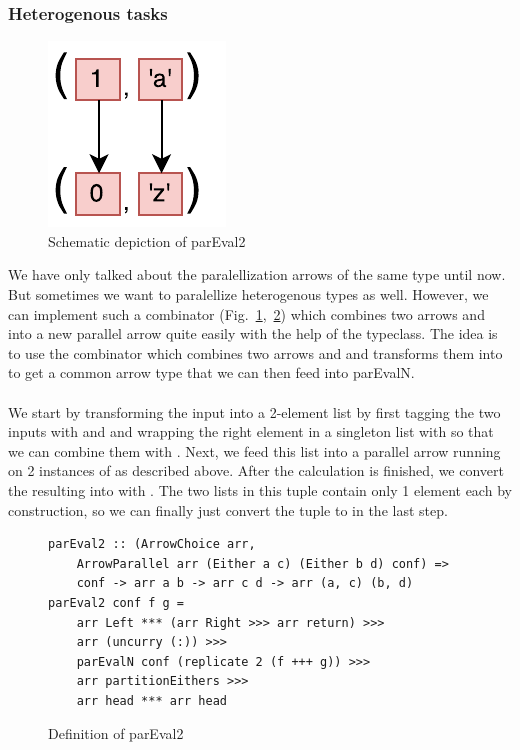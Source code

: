 \subsubsection{Heterogenous tasks}
\begin{figure}[h]
	\includegraphics[scale=0.7]{images/parEval2}
	\caption{Schematic depiction of parEval2}
	\label{fig:parEval2Img}
\end{figure}
We have only talked about the paralellization arrows of the same type until now. But sometimes we want to paralellize heterogenous types as well. However, we can implement such a  combinator (Fig.~\ref{fig:parEval2Img},~\ref{fig:parEval2}) which combines two arrows  and  into a new parallel arrow  quite easily with the help of the  typeclass. The idea is to use the \inlinecode{+++} combinator which combines two arrows  and  and transforms them into  to get a common arrow type that we can then feed into parEvalN.
\\\\
We start by transforming the  input into a 2-element list \inlinecode{[Either a c]} by first tagging the two inputs with  and  and wrapping the right element in a singleton list with  so that we can combine them with . Next, we feed this list into a parallel arrow running on 2 instances of  as described above. After the calculation is finished, we convert the resulting \inlinecode{[Either b d]} into \inlinecode{([b], [d])} with . The two lists in this tuple contain only 1 element each by construction, so we can finally just convert the tuple to  in the last step.
\begin{figure}[h]
\begin{lstlisting}[frame=htrbl]
parEval2 :: (ArrowChoice arr,
	ArrowParallel arr (Either a c) (Either b d) conf) =>
	conf -> arr a b -> arr c d -> arr (a, c) (b, d)
parEval2 conf f g = 
	arr Left *** (arr Right >>> arr return) >>>
	arr (uncurry (:)) >>>
	parEvalN conf (replicate 2 (f +++ g)) >>>
	arr partitionEithers >>>
	arr head *** arr head
\end{lstlisting}
	\caption{Definition of parEval2}
	\label{fig:parEval2}
\end{figure}


